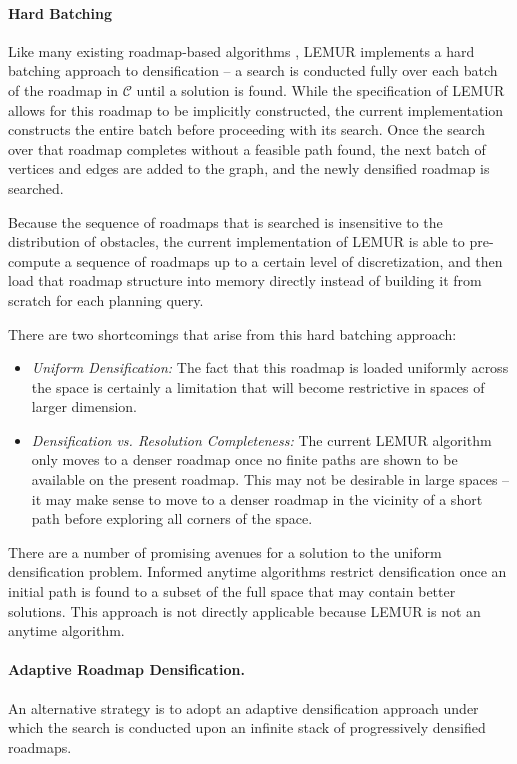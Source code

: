 \paragraph{Hard Batching}
Like many existing roadmap-based algorithms
\citep{starek2015bfmtstar, gammell2015bitstar},
LEMUR implements a hard batching approach to densification --
a search is conducted fully over each batch of the roadmap
in $\mathcal{C}$
until a solution is found.
While the specification of LEMUR allows for this roadmap to be
implicitly constructed,
the current implementation constructs the entire batch before
proceeding with its search.
Once the search over that roadmap completes without a feasible path found,
the next batch of vertices and edges are added to the graph,
and the newly densified roadmap is searched.

Because the sequence of roadmaps that is searched is insensitive to
the distribution of obstacles,
the current implementation of LEMUR is able to pre-compute a sequence
of roadmaps up to a certain level of discretization,
and then load that roadmap structure into memory directly
instead of building it from scratch for each planning query.

There are two shortcomings that arise from this hard batching approach:

\begin{itemize}
\item \emph{Uniform Densification:}
   The fact that this roadmap is loaded uniformly across the space
   is certainly a limitation that will become restrictive
   in spaces of larger dimension.
\item \emph{Densification vs. Resolution Completeness:}
   The current LEMUR algorithm only moves to a denser roadmap
   once no finite paths are shown to be available on the present
   roadmap.
   This may not be desirable in large spaces --
   it may make sense to move to a denser roadmap in the vicinity of
   a short path before exploring all corners of the space.
\end{itemize}

There are a number of promising avenues for a solution
to the uniform densification problem.
Informed anytime algorithms
\citep{gammell2014informedrrtstar, gammell2015bitstar}
restrict densification once an initial path is found to a subset of
the full space that may contain better solutions.
This approach is not directly applicable
because LEMUR is not an anytime algorithm.

\paragraph{Adaptive Roadmap Densification.}
An alternative strategy is to adopt an adaptive densification approach
under which the search is conducted upon an infinite stack of
progressively densified roadmaps.

